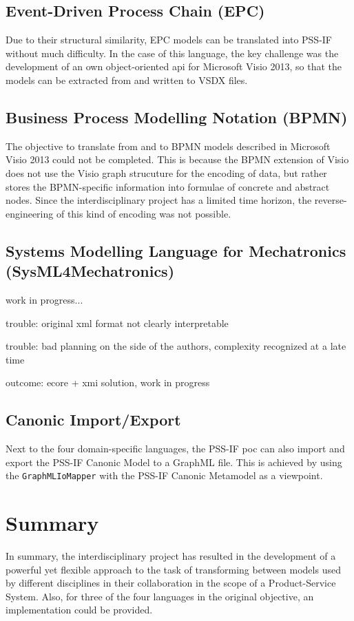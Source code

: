 \subsection{Event-Driven Process Chain (EPC)}

Due to their structural similarity, EPC models can be translated into PSS-IF without much difficulty. In the case of this language, the key challenge was the development of an own object-oriented \gls{api} for Microsoft Visio 2013, so that the models can be extracted from and written to VSDX files.

\subsection{Business Process Modelling Notation (BPMN)}

The objective to translate from and to BPMN models described in Microsoft Visio 2013 could not be completed. This is because the BPMN extension of Visio does not use the Visio graph strucuture for the encoding of data, but rather stores the BPMN-specific information into formulae of concrete and abstract nodes. Since the interdisciplinary project has a limited time horizon, the reverse-engineering of this kind of encoding was not possible. 

\subsection{Systems Modelling Language for Mechatronics (SysML4Mechatronics)}

\color{red} work in progress...\color{black}

trouble: original xml format not clearly interpretable

trouble: bad planning on the side of the authors, complexity recognized at a late time

outcome: ecore + xmi solution, \color{red}work in progress\color{black}

\subsection{Canonic Import/Export}

Next to the four domain-specific languages, the PSS-IF \gls{poc} can also import and export the PSS-IF Canonic Model to a GraphML file. This is achieved by using the \texttt{GraphMLIoMapper} with the PSS-IF Canonic Metamodel as a viewpoint.


\section{Summary}
\label{sec:results:summary}

In summary, the interdisciplinary project has resulted in the development of a powerful yet flexible approach to the task of transforming between models used by different disciplines in their collaboration in the scope of a Product-Service System. Also, for three of the four languages in the original objective, an implementation could be provided.